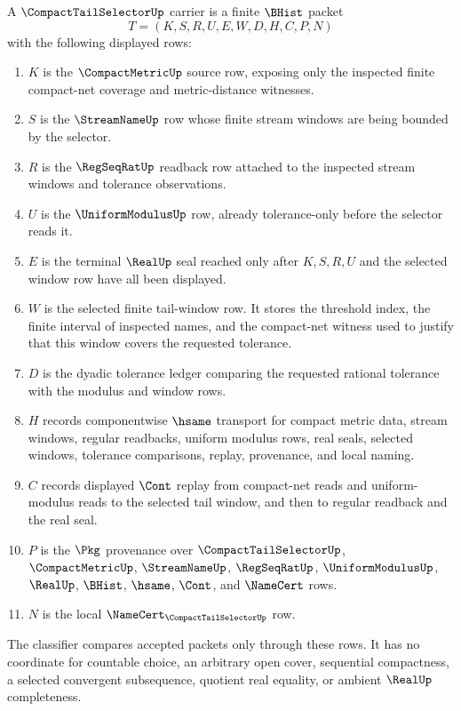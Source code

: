 \begin{definition}
\label{def:compact-tail-selector-carrier}
A $\CompactTailSelectorUp$ carrier is a finite $\BHist$ packet
$$
T=(K,S,R,U,E,W,D,H,C,P,N)
$$
with the following displayed rows:
\begin{enumerate}
\item $K$ is the $\CompactMetricUp$ source row, exposing only the inspected finite compact-net coverage and metric-distance witnesses.
\item $S$ is the $\StreamNameUp$ row whose finite stream windows are being bounded by the selector.
\item $R$ is the $\RegSeqRatUp$ readback row attached to the inspected stream windows and tolerance observations.
\item $U$ is the $\UniformModulusUp$ row, already tolerance-only before the selector reads it.
\item $E$ is the terminal $\RealUp$ seal reached only after $K,S,R,U$ and the selected window row have all been displayed.
\item $W$ is the selected finite tail-window row. It stores the threshold index, the finite interval of inspected names, and the compact-net witness used to justify that this window covers the requested tolerance.
\item $D$ is the dyadic tolerance ledger comparing the requested rational tolerance with the modulus and window rows.
\item $H$ records componentwise $\hsame$ transport for compact metric data, stream windows, regular readbacks, uniform modulus rows, real seals, selected windows, tolerance comparisons, replay, provenance, and local naming.
\item $C$ records displayed $\Cont$ replay from compact-net reads and uniform-modulus reads to the selected tail window, and then to regular readback and the real seal.
\item $P$ is the $\Pkg$ provenance over $\CompactTailSelectorUp$, $\CompactMetricUp$, $\StreamNameUp$, $\RegSeqRatUp$, $\UniformModulusUp$, $\RealUp$, $\BHist$, $\hsame$, $\Cont$, and $\NameCert$ rows.
\item $N$ is the local $\NameCert_{\CompactTailSelectorUp}$ row.
\end{enumerate}
The classifier compares accepted packets only through these rows. It has no coordinate for countable choice, an arbitrary open cover, sequential compactness, a selected convergent subsequence, quotient real equality, or ambient $\RealUp$ completeness.
\end{definition}

